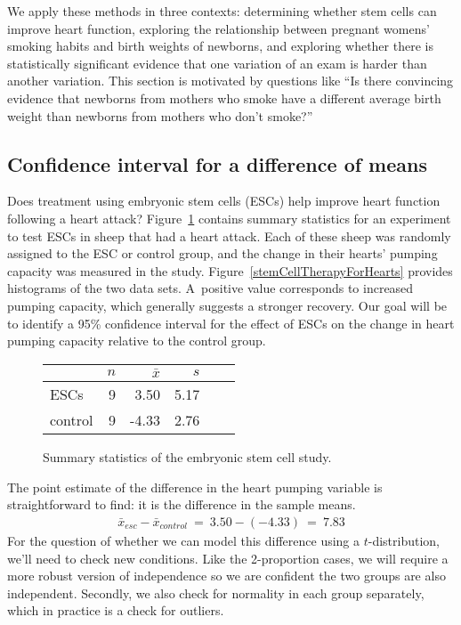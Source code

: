 We apply these methods in three contexts: determining whether
stem cells can improve heart function,
exploring the relationship between pregnant womens' smoking
habits and birth weights of newborns,
and exploring whether there is statistically significant
evidence that one variation of an exam is harder than
another variation.
This section is motivated by questions like
``Is there convincing evidence that newborns from mothers
who smoke have a different average birth weight than newborns
from mothers who don't smoke?''


\subsection{Confidence interval for a difference of means}


Does treatment using embryonic stem cells (ESCs)
help improve heart function following a heart attack?
Figure~\ref{statsSheepEscStudy} contains summary statistics
for an experiment to test ESCs in sheep that had a heart attack.
Each of these sheep was randomly assigned to the ESC
or control group, and the change in their hearts' pumping
capacity was measured in the study.
Figure~\ref{stemCellTherapyForHearts} provides
histograms of the two data sets.
A~positive value corresponds to increased pumping capacity,
which generally suggests a stronger recovery.
Our goal will be to identify a 95\% confidence interval
for the effect of ESCs on the change in heart pumping
capacity relative to the control group.

\begin{figure}[h]
\centering
\begin{tabular}{l rrrrr}
\hline
\hspace{10mm}	& $n$	& $\bar{x}$	& $s$  \\
\hline
ESCs     & 9  & 3.50   & 5.17  \\
control  & 9  & -4.33  & 2.76  \\
\hline
\end{tabular}
\caption{Summary statistics of the embryonic stem cell study.}
\label{statsSheepEscStudy}
\end{figure}

The point estimate of the difference in the heart pumping variable
is straightforward to find: it is the difference in the sample means.
\begin{align*}
\bar{x}_{esc} - \bar{x}_{control}\ 
  =\ 3.50 - (-4.33)\ 
  =\ 7.83
\end{align*}
For the question of whether we can model this difference
using a $t$-distribution, we'll need to check new conditions.
Like the 2-proportion cases, we will require a more
robust version of independence so we are confident
the two groups are also independent.
Secondly, we also check for normality in each
group separately, which in practice is a check
for outliers.

